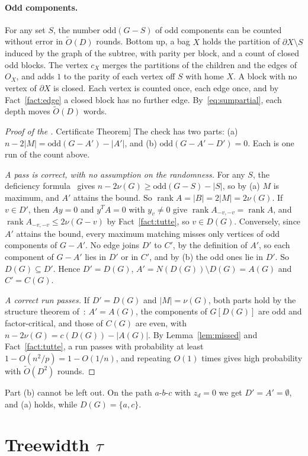 \documentclass[11pt]{article}
\theoremstyle{definition}
\theoremstyle{remark}
\theoremstyle{plain}
\newcommand{\ThmCert}{\hyperref[thm:cert]{Certificate Theorem}}
\newcommand{\Ot}{\tilde O}
\newcommand{\rank}{\operatorname{rank}}
\newcommand{\odd}{\mathrm{odd}}
\begin{document}
\paragraph{Odd components.} For any set $S$, the number $\odd(G-S)$ of odd components can be counted without error in $\Ot(D)$ rounds. Bottom up, a bag $X$ holds the partition of $\partial X\setminus S$ induced by the graph of the
subtree, with parity per block, and a count of closed odd blocks. The vertex $c_X$ merges the partitions of the children and the edges of $O_X$, and adds $1$ to the parity of each vertex off $S$ with home $X$. A block with no
vertex of $\partial X$ is closed. Each vertex is counted once, each edge once, and by Fact~\ref{fact:edge} a closed block has no further edge. By~\eqref{eq:sumpartial}, each depth moves $\Ot(D)$ words.

\begin{proof}[Proof of the \ThmCert{}]
The check has two parts: (a) $n-2|M|=\odd(G-A')-|A'|$, and (b) $\odd(G-A'-D')=0$. Each is one run of the count above.

\emph{A pass is correct, with no assumption on the randomness.} For any $S$, the deficiency formula~\cite{LoP86} gives $n-2\nu(G)\ge\odd(G-S)-|S|$, so by (a) $M$ is maximum, and $A'$ attains the bound. So
$\rank A=|B|=2|M|=2\nu(G)$. If $v\in D'$, then $Ay=0$ and $y^TA=0$ with $y_v\ne0$ give $\rank A_{-v,-v}=\rank A$, and $\rank A_{-v,-v}\le2\nu(G-v)$ by Fact~\ref{fact:tutte}, so $v\in D(G)$. Conversely, since $A'$
attains the bound, every maximum matching misses only vertices of odd components of $G-A'$. No edge joins $D'$ to $C'$, by the definition of $A'$, so each component of $G-A'$ lies in $D'$ or in $C'$, and by (b) the odd ones lie
in $D'$. So $D(G)\subseteq D'$. Hence $D'=D(G)$, $A'=N(D(G))\setminus D(G)=A(G)$ and $C'=C(G)$.

\emph{A correct run passes.} If $D'=D(G)$ and $|M|=\nu(G)$, both parts hold by the structure theorem of~\cite{LoP86}: $A'=A(G)$, the components of $G[D(G)]$ are odd and factor-critical, and those of $C(G)$ are even, with
$n-2\nu(G)=c(D(G))-|A(G)|$. By Lemma~\ref{lem:missed} and Fact~\ref{fact:tutte}, a run passes with probability at least $1-O(n^2/p)=1-O(1/n)$, and repeating $O(1)$ times gives high probability with $\Ot(D^2)$ rounds.
\end{proof}

Part (b) cannot be left out. On the path $a$-$b$-$c$ with $z_d=0$ we get $D'=A'=\emptyset$, and (a) holds, while $D(G)=\{a,c\}$.

\section{Treewidth \texorpdfstring{$\tau$}{tau}}\label{sec:tw}
\end{document}
